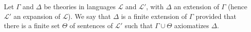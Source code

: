 Let $\Gamma$ and $\Delta$ be theories in languages $\mathcal{L}$ and $\mathcal{L}'$, with $\Delta$ an extension of $\Gamma$ (hence $\mathcal{L}'$ an expansion of $\mathcal{L}$). We say that $\Delta$ is a finite extension of $\Gamma$ provided that there is a finite set $\Theta$ of sentences of $\mathcal{L}'$ such that $\Gamma \cup \Theta$ axiomatizes $\Delta$.
